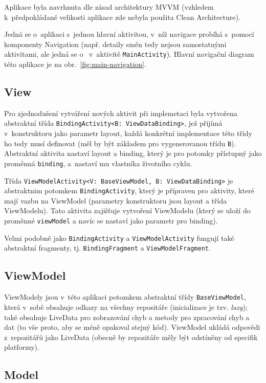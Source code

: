 \documentclass[twoside]{ctuthesis}
\begin{document}
Aplikace byla navrhnuta dle zásad architektury MVVM (vzhledem k~před\-po\-klá\-da\-né velikosti aplikace zde nebyla použita Clean Architecture).

Jedná se o~aplikaci s~jednou hlavní aktivitou, v~níž navigace probíhá s~pomocí komponenty Navigation (např. detaily směn tedy nejsou sa\-mos\-tat\-ný\-mi aktivitami, ale jedná se o~ v~aktivitě \texttt{MainActivity}). Hlavní navigační diagram této aplikace je na obr.~\ref{fig:main-navigation}.


\subsection{View}

Pro zjednodušení vytváření nových aktivit při implemetaci byla vytvořena abstraktní třída \texttt{BindingActivity<B: ViewDataBinding>}, jež přijímá v~kon\-struk\-to\-ru jako parametr layout, každá konkrétní implementace této třídy ho tedy musí definovat (měl by být základem pro vygenerovanou třídu \texttt{B}). Abstraktní aktivita nastaví layout a binding, který je pro potomky přístupný jako proměnná \texttt{binding}, a~nastaví mu vlastníka životního cyklu.

Třída \texttt{ViewModelActivity<V: BaseViewModel, B:  ViewDataBinding>} je abstraktnim potomkem \texttt{BindingActivity}, který je přípraven pro aktivity, které mají vazbu na ViewModel (parametry konstruktoru jsou layout a třída ViewModelu). Tato aktivita zajišťuje vytvoření ViewModelu (který se uloží do proměnné \texttt{viewModel} a navíc se nastaví jako parametr pro binding).

Velmi podobně jako \texttt{BindingActivity} a \texttt{ViewModelActivity} fungují také abstraktní fragmenty, tj. \texttt{BindingFragment} a \texttt{ViewModelFragment}.

\subsection{ViewModel}

ViewModely jsou v~této aplikaci potomkem abstraktní třídy \texttt{BaseViewModel}, která v~sobě obsahuje odkazy na všechny repositáře (inicializace je tzv. \textit{lazy}); také obsahuje LiveData pro zobrazování chyb a metody pro zpracování chyb a dat (to vše proto, aby se méně opakoval stejný kód). ViewModel ukládá odpovědi z~repozitářů jako LiveData (obecně by repozitáře měly být odstíněny od specifik platformy).

\subsection{Model}
\end{document}
